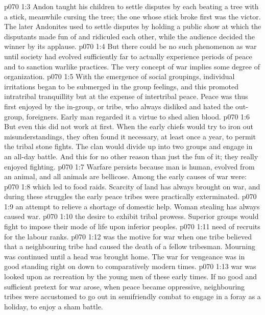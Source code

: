 \vs p070 1:3 Andon taught his children to settle disputes by each beating a tree with a stick, meanwhile cursing the tree; the one whose stick broke first was the victor. The later Andonites used to settle disputes by holding a public show at which the disputants made fun of and ridiculed each other, while the audience decided the winner by its applause.
\vs p070 1:4 But there could be no such phenomenon as war until society had evolved sufficiently far to actually experience periods of peace and to sanction warlike practices. The very concept of war implies some degree of organization.
\vs p070 1:5 With the emergence of social groupings, individual irritations began to be submerged in the group feelings, and this promoted intratribal tranquillity but at the expense of intertribal peace. Peace was thus first enjoyed by the in\hyp{}group, or tribe, who always disliked and hated the out\hyp{}group, foreigners. Early man regarded it a virtue to shed alien blood.
\vs p070 1:6 But even this did not work at first. When the early chiefs would try to iron out misunderstandings, they often found it necessary, at least once a year, to permit the tribal stone fights. The clan would divide up into two groups and engage in an all\hyp{}day battle. And this for no other reason than just the fun of it; they really enjoyed fighting.
\vs p070 1:7 \pc Warfare persists because man is human, evolved from an animal, and all animals are bellicose. Among the early causes of war were:
\vs p070 1:8 \bibnobreakspace {} which led to food raids. Scarcity of land has always brought on war, and during these struggles the early peace tribes were practically exterminated.
\vs p070 1:9 \bibnobreakspace {} an attempt to relieve a shortage of domestic help. Woman stealing has always caused war.
\vs p070 1:10 \bibnobreakspace {} the desire to exhibit tribal prowess. Superior groups would fight to impose their mode of life upon inferior peoples.
\vs p070 1:11 \bibnobreakspace {} need of recruits for the labour ranks.
\vs p070 1:12 \bibnobreakspace {} was the motive for war when one tribe believed that a neighbouring tribe had caused the death of a fellow tribesman. Mourning was continued until a head was brought home. The war for vengeance was in good standing right on down to comparatively modern times.
\vs p070 1:13 \bibnobreakspace {} war was looked upon as recreation by the young men of these early times. If no good and sufficient pretext for war arose, when peace became oppressive, neighbouring tribes were accustomed to go out in semifriendly combat to engage in a foray as a holiday, to enjoy a sham battle.
